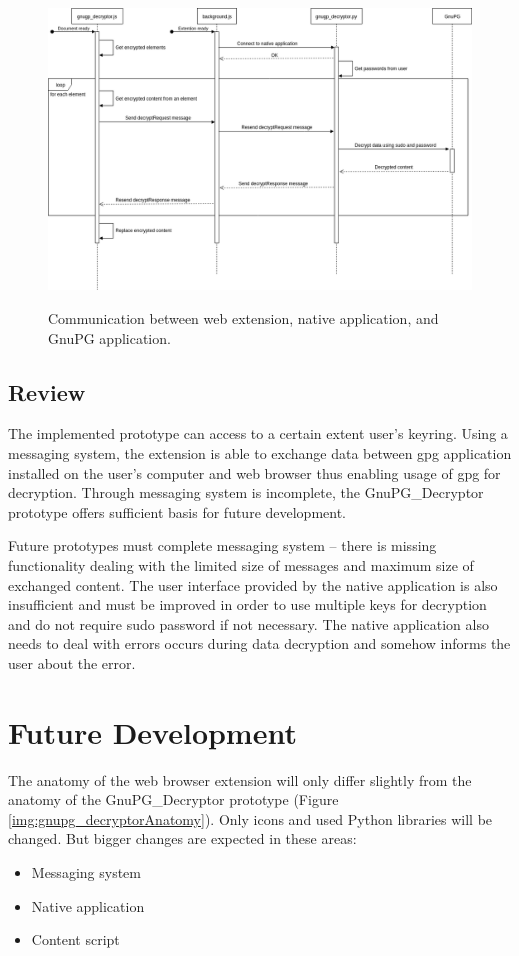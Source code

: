 \begin{figure}[H]
    \begin{center}
        \label{img:gnupg_decryptor-sequence}
        \includegraphics[width=1.0\textwidth]{obrazky-figures/sequence-gnupg_decryptor.png}
        \caption{Communication between web extension, native application, and GnuPG application.}
    \end{center}
\end{figure}

\subsection{Review}
The implemented prototype can access to a certain extent user's keyring. Using a messaging system, the extension is able to exchange data between gpg application installed on the user's computer and web browser thus enabling usage of gpg for decryption. Through messaging system is incomplete, the GnuPG\_Decryptor prototype offers sufficient basis for future development.

Future prototypes must complete messaging system -- there is missing functionality dealing with the limited size of messages and maximum size of exchanged content. The user interface provided by the native application is also insufficient and must be improved in order to use multiple keys for decryption and do not require sudo password if not necessary. The native application also needs to deal with errors occurs during data decryption and somehow informs the user about the error.

\section{Future Development}
The anatomy of the web browser extension will only differ slightly from the anatomy of the GnuPG\_Decryptor prototype (Figure \ref{img:gnupg_decryptorAnatomy}). Only icons and used Python libraries will be changed. But bigger changes are expected in these areas:
\begin{itemize}
    \item Messaging system
    \item Native application
    \item Content script
\end{itemize}

